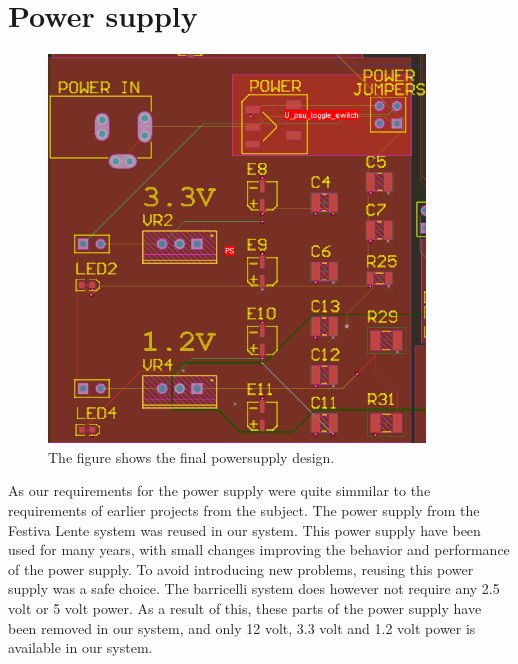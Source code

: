 \section {Power supply}

\begin{figure}
\centering
\includegraphics[width=10cm,keepaspectratio]{pcb/powersuplyphoto.png}
\caption{The figure shows the final powersupply design. }
\label{figure:powersuplyphoto}
\end{figure}


As our requirements for the power supply were quite simmilar to the requirements of earlier projects from the subject.
The power supply from the Festiva Lente system was reused in our system.
This power supply have been used for many years, with small changes improving the behavior and performance of the power supply.
To avoid introducing new problems, reusing this power supply was a safe choice.
The barricelli system does however not require any 2.5 volt or 5 volt power.
As a result of this, these parts of the power supply have been removed in our system, and only 12 volt, 3.3 volt and 1.2 volt power is available in our system.



